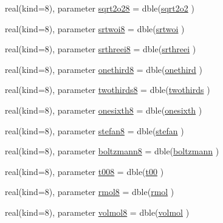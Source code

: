 \begin{DoxyCompactItemize}
\item 
real(kind=8), parameter \hyperlink{namespaceconsts__coms_a48b8676172e0d996bb646f8bd0d01e26}{sqrt2o28} = dble(\hyperlink{namespaceconsts__coms_a21cd110a4618508e5aabb43b56aa56d6}{sqrt2o2} )
\item 
real(kind=8), parameter \hyperlink{namespaceconsts__coms_a3360764f696a099efdec0e23febe82d8}{srtwoi8} = dble(\hyperlink{namespaceconsts__coms_a1dbb872d0aae3243d72b9c43864ec88f}{srtwoi} )
\item 
real(kind=8), parameter \hyperlink{namespaceconsts__coms_a0b5dc83302d90a8e7fe30ffed222c517}{srthreei8} = dble(\hyperlink{namespaceconsts__coms_a448722d61ca70f7d3d572048be47c1e5}{srthreei} )
\item 
real(kind=8), parameter \hyperlink{namespaceconsts__coms_a56785c4a5099759491b652bdcd9439f0}{onethird8} = dble(\hyperlink{namespaceconsts__coms_a77951232affbc4dc54bd20a0dfe1244f}{onethird} )
\item 
real(kind=8), parameter \hyperlink{namespaceconsts__coms_a9e055a545c5ace049296c3a15aa12b83}{twothirds8} = dble(\hyperlink{namespaceconsts__coms_a7ac856e6d8ab0454fcd39dce6cd2ea71}{twothirds} )
\item 
real(kind=8), parameter \hyperlink{namespaceconsts__coms_a533ba43ea618917f7a64b64e74cac72e}{onesixth8} = dble(\hyperlink{namespaceconsts__coms_ada6e5b6811f533bff45549fe556966ee}{onesixth} )
\item 
real(kind=8), parameter \hyperlink{namespaceconsts__coms_a5f113af284d2f76449a49c827db77373}{stefan8} = dble(\hyperlink{namespaceconsts__coms_af216e24a2bb718d85f4e5501f586634e}{stefan} )
\item 
real(kind=8), parameter \hyperlink{namespaceconsts__coms_a46e0614f5166dcc3513d6447c2aa7212}{boltzmann8} = dble(\hyperlink{namespaceconsts__coms_afc5519d22399e9054c914e08f4b03bc5}{boltzmann} )
\item 
real(kind=8), parameter \hyperlink{namespaceconsts__coms_acba5e51574aed080f17d371bbcd3cb34}{t008} = dble(\hyperlink{namespaceconsts__coms_afbc98a1338166b05d3a2d997c7b27259}{t00} )
\item 
real(kind=8), parameter \hyperlink{namespaceconsts__coms_a3addc2c9f3482a3de83c7c18c2f462f4}{rmol8} = dble(\hyperlink{namespaceconsts__coms_ada5d8a1334128cdd95a8a4e15c149599}{rmol} )
\item 
real(kind=8), parameter \hyperlink{namespaceconsts__coms_a2f3906a20f2db696a3a274df51b36123}{volmol8} = dble(\hyperlink{namespaceconsts__coms_a2c08b6494703da0637aaf244befddfe2}{volmol} )
\item 

\end{DoxyCompactItemize}
